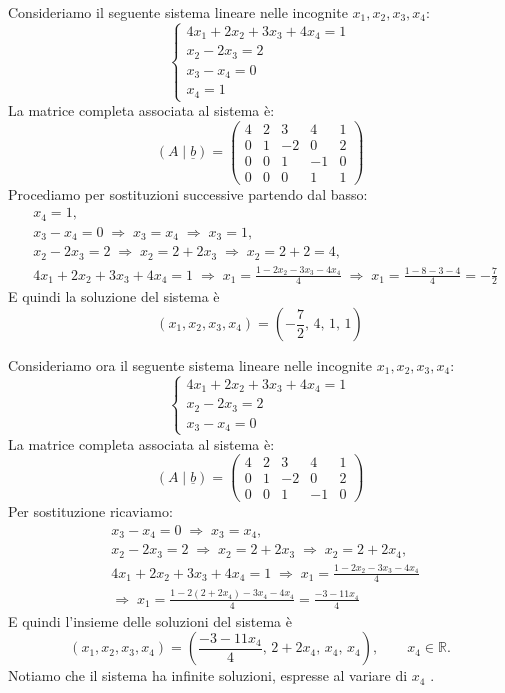 \documentclass[
  a4paper,
]{article}
\begin{document}
\begin{examplebox}
Consideriamo il seguente sistema lineare nelle incognite
\(x_1, x_2, x_3, x_4\): \[
\begin{cases}
4x_1 + 2x_2 + 3x_3 + 4x_4 = 1\\
x_2 - 2x_3 = 2\\
x_3 - x_4 = 0\\
x_4 = 1
\end{cases}
\] La matrice completa associata al sistema è: \[
(A\mid \underline{b})=
\left(
\begin{array}{cccc|c}
4 & 2 & 3 & 4 & 1\\
0 & 1 & -2 & 0 & 2\\
0 & 0 & 1 & -1 & 0\\
0 & 0 & 0 & 1 & 1
\end{array}
\right)
\] Procediamo per sostituzioni successive partendo dal basso: \[
\begin{aligned}
&x_4 = 1,\\[4pt]
&x_3 - x_4 = 0 \;\Rightarrow\; x_3 = x_4 \;\Rightarrow\; x_3 = 1,\\[4pt]
&x_2 - 2x_3 = 2 \;\Rightarrow\; x_2 = 2 + 2x_3 \;\Rightarrow\; x_2 = 2 + 2 = 4,\\[4pt]
&4x_1 + 2x_2 + 3x_3 + 4x_4 = 1 \;\Rightarrow\; 
x_1 = \frac{1 - 2x_2 - 3x_3 - 4x_4}{4}\;\Rightarrow\; x_1 = \frac{1 - 8 - 3 - 4}{4}
= -\frac{7}{2}
\end{aligned}
\]E quindi la soluzione del sistema è\[
(x_1,x_2,x_3,x_4)=\left(-\frac{7}{2},\,4,\,1,\,1\right)
\]
\end{examplebox}

\begin{examplebox}
Consideriamo ora il seguente sistema lineare nelle incognite
\(x_1, x_2, x_3, x_4\): \[
\begin{cases}
4x_1 + 2x_2 + 3x_3 + 4x_4 = 1\\
x_2 - 2x_3 = 2\\
x_3 - x_4 = 0
\end{cases}
\] La matrice completa associata al sistema è: \[
(A\mid \underline{b})=
\left(
\begin{array}{cccc|c}
4 & 2 & 3 & 4 & 1\\
0 & 1 & -2 & 0 & 2\\
0 & 0 & 1 & -1 & 0
\end{array}
\right)
\] Per sostituzione ricaviamo: \[
\begin{aligned}
&x_3 - x_4 = 0 \;\Rightarrow\; x_3 = x_4,\\[4pt]
&x_2 - 2x_3 = 2 \;\Rightarrow\; x_2 = 2 + 2x_3 \;\Rightarrow\; x_2 = 2 + 2x_4,\\[4pt]
&4x_1 + 2x_2 + 3x_3 + 4x_4 = 1 \;\Rightarrow\;
x_1 = \frac{1 - 2x_2 - 3x_3 - 4x_4}{4}\\
&\Rightarrow\;
x_1 = \frac{1 - 2(2+2x_4) - 3x_4 - 4x_4}{4}
= \frac{-3 - 11x_4}{4}
\end{aligned}
\] E quindi l'insieme delle soluzioni del sistema è \[
(x_1,x_2,x_3,x_4)=\left(\frac{-3-11x_4}{4},\,2+2x_4,\,x_4,\,x_4\right),
\qquad x_4\in\mathbb{R}.
\] Notiamo che il sistema ha infinite soluzioni, espresse al variare di
\(x_4\) .
\end{examplebox}
\end{document}
